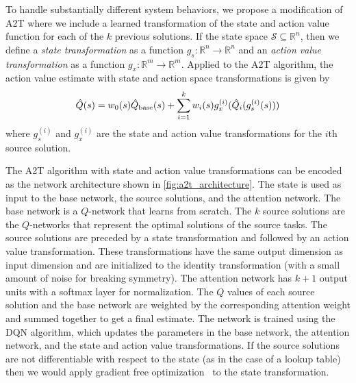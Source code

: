 To handle substantially different system behaviors, we propose a modification of A2T where we include a learned transformation of the state and action value function for each of the $k$ previous solutions. If the state space $\mathcal{S} \subseteq \mathbb{R}^n$, then we define a \emph{state transformation} as a function $g_s : \mathbb{R}^n \to \mathbb{R}^n$ and an \emph{action value transformation} as a function $g_x : \mathbb{R}^m \to \mathbb{R}^m$. Applied to the A2T algorithm, the action value estimate with state and action space transformations is given by
\begin{equation}
\hat{Q}(s) = w_0(s) \hat{Q}_{\rm base}(s) + \sum_{i=1}^k w_i(s) g_x^{(i)}(\hat{Q}_i(g_s^{(i)}(s)))
\end{equation}
where $g_s^{(i)}$ and $g_x^{(i)}$ are the state and action value transformations for the $i$th source solution. 



The A2T algorithm with state and action value transformations can be encoded as the network architecture shown in \cref{fig:a2t_architecture}. The state is used as input to the base network, the source solutions, and the attention network. The base network is a $Q$-network that learns from scratch. The $k$ source solutions are the $Q$-networks that represent the optimal solutions of the source tasks. The source solutions are preceded by a state transformation and followed by an action value transformation. These transformations have the same output dimension as input dimension and are initialized to the identity transformation (with a small amount of noise for breaking symmetry). The attention network has $k+1$ output units with a softmax layer for normalization. The $Q$ values of each source solution and the base network are weighted by the corresponding attention weight and summed together to get a final estimate. The network is trained using the DQN algorithm, which updates the parameters in the base network, the attention network, and the state and action value transformations. If the source solutions are not differentiable with respect to the state (as in the case of a lookup table) then we would apply gradient free optimization~\cite{kochenderfer2019algorithms} to the state transformation.

